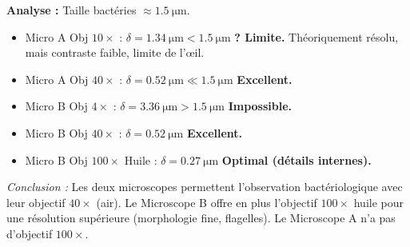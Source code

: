 \documentclass[11pt]{article}
\begin{document}
\begin{exoresolu}
\medskip
\noindent \textbf{Analyse :} Taille bactéries $\approx \SI{1,5}{\um}$.
\begin{itemize}
    \item Micro A Obj $10\times$ : $\delta = \SI{1,34}{\um} < \SI{1,5}{\um}$ \textbf{? Limite.} Théoriquement résolu, mais contraste faible, limite de l'œil.
    \item Micro A Obj $40\times$ : $\delta = \SI{0,52}{\um} \ll \SI{1,5}{\um}$ \textbf{Excellent.}
    \item Micro B Obj $4\times$ : $\delta = \SI{3,36}{\um} > \SI{1,5}{\um}$ \textbf{Impossible.}
    \item Micro B Obj $40\times$ : $\delta = \SI{0,52}{\um}$ \textbf{Excellent.}
    \item Micro B Obj $100\times$ Huile : $\delta = \SI{0,27}{\um}$ \textbf{Optimal (détails internes).}
\end{itemize}
\emph{Conclusion :} Les deux microscopes permettent l'observation bactériologique avec leur objectif $40\times$ (air). Le Microscope B offre en plus l'objectif $100\times$ huile pour une résolution supérieure (morphologie fine, flagelles). Le Microscope A n'a pas d'objectif $100\times$.


\end{exoresolu}
\end{document}
